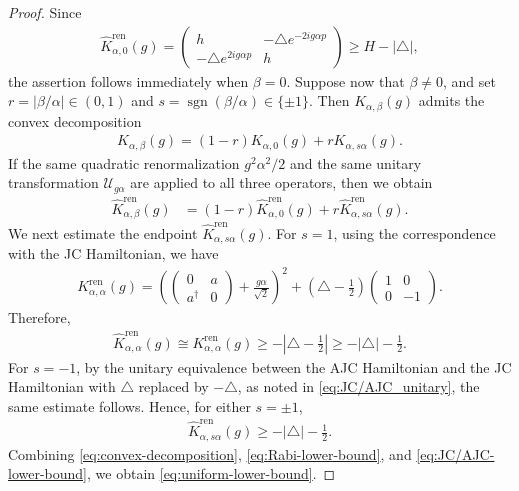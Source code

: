\documentclass[12pt,dvipdfmx]{article}
\begin{document}
\begin{proof}
Since
\begin{align}\label{eq:Rabi-lower-bound}
    \hat{K}_{\alpha,0}^{\mathrm{ren} }(g)
    =
    \begin{pmatrix}
        h & -\triangle e^{-2ig\alpha p}\\
        -\triangle e^{2ig\alpha p} & h
    \end{pmatrix}
    \ge 
    H - |\triangle|,
\end{align}
the assertion follows immediately when $\beta=0$.
Suppose now that $\beta\ne0$, and set $r=|\beta/\alpha|\in(0,1)$ and $s=\operatorname{sgn}(\beta/\alpha)\in\{\pm1\}$. Then $K_{\alpha,\beta}(g)$ admits the convex decomposition
\begin{align*}
    K_{\alpha,\beta}(g)
    =
    (1 - r) K_{\alpha,0}(g) + r K_{\alpha,s\alpha}(g).
\end{align*}
If the same quadratic renormalization $g^2\alpha^2/2$ and the same unitary transformation $\mathcal{U} _{g\alpha}$ are applied to all three operators, then we obtain
\begin{align}\label{eq:convex-decomposition}
    \hat{K}_{\alpha,\beta}^{\mathrm{ren} }(g)
    &=
    (1 - r) \hat{K}_{\alpha,0}^{\mathrm{ren} }(g) 
    + 
    r \hat{K}_{\alpha,s\alpha}^{\mathrm{ren} }(g).
\end{align}
We next estimate the endpoint $\hat{K}_{\alpha,s\alpha}^{\mathrm{ren} }(g)$.
For $s=1$, using the correspondence with the JC Hamiltonian,
we have
\begin{align*}
    K_{\alpha,\alpha}^{\mathrm{ren} }(g)
=
    \left(
        \begin{pmatrix} 0 & a\\ a^\dagger & 0 \end{pmatrix}
        + 
        \frac{g\alpha}{\sqrt2}
    \right)^2
    +
    \left(\triangle - \frac12\right)
    \begin{pmatrix} 1 & 0\\ 0 & -1 \end{pmatrix}.
\end{align*}
Therefore,
\begin{align*}
    \hat{K}_{\alpha,\alpha}^{\mathrm{ren} }(g)
    \cong
    K_{\alpha,\alpha}^{\mathrm{ren} }(g)
    \ge
    -\left| \triangle - \frac12 \right|
    \ge
    -|\triangle| - \frac12.
\end{align*}
For $s=-1$, by the unitary equivalence between the AJC Hamiltonian and the JC Hamiltonian with $\triangle$ replaced by $-\triangle$, as noted in \eqref{eq:JC/AJC_unitary}, the same estimate follows. Hence, for either $s=\pm1$,
\begin{align}\label{eq:JC/AJC-lower-bound}
    \hat{K}_{\alpha,s\alpha}^{\mathrm{ren} }(g)
    \ge
    -|\triangle| - \frac12.
\end{align}
Combining \eqref{eq:convex-decomposition}, \eqref{eq:Rabi-lower-bound}, and \eqref{eq:JC/AJC-lower-bound}, we obtain \eqref{eq:uniform-lower-bound}.
\end{proof}
\end{document}
